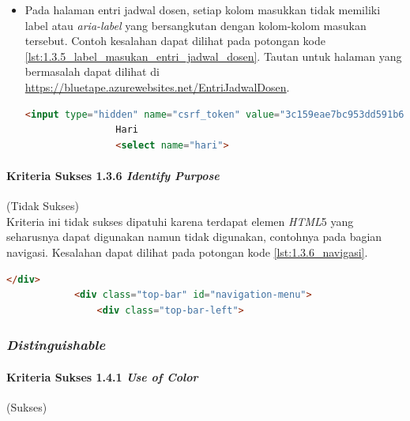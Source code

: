 \documentclass[a4paper,twoside]{article}
\begin{document}
\begin{enumerate}
\begin{itemize}
			\item Pada halaman entri jadwal dosen, setiap kolom masukkan tidak memiliki label atau \textit{aria-label} yang bersangkutan dengan kolom-kolom masukan tersebut. Contoh kesalahan dapat dilihat pada potongan kode \ref{lst:1.3.5_label_masukan_entri_jadwal_dosen}. Tautan untuk halaman yang bermasalah dapat dilihat di \url{https://bluetape.azurewebsites.net/EntriJadwalDosen}.
			\begin{lstlisting}[frame=single, label={lst:1.3.5_label_masukan_entri_jadwal_dosen}, language=HTML, caption=Kriteria Sukses 1.3.5 - Tidak Terdapat Label pada Kolom Masukan di Halaman Entri Jadwal Dosen]
				<input type="hidden" name="csrf_token" value="3c159eae7bc953dd591b679c080ed066" />
				Hari
				<select name="hari">
			\end{lstlisting}
		\end{itemize}

		\paragraph{Kriteria Sukses 1.3.6 \textit{Identify Purpose}}
		\label{par:kepatuhan_bluetape_kriteria_sukses_1.3.6}
		(Tidak Sukses)\\

		Kriteria ini tidak sukses dipatuhi karena terdapat elemen \textit{HTML}5 yang seharusnya dapat digunakan namun tidak digunakan, contohnya pada bagian navigasi. Kesalahan dapat dilihat pada potongan kode \ref{lst:1.3.6_navigasi}.

		\begin{lstlisting}[frame=single, label={lst:1.3.6_navigasi}, language=HTML, caption=Kriteria Sukses 1.3.6 - Navigasi]
			</div>
			<div class="top-bar" id="navigation-menu">
				<div class="top-bar-left">
		\end{lstlisting}

		\subsubsection*{\textit{Distinguishable}}
		\label{subsubsec:kepatuhan_bluetape_distinguishable}

		\paragraph{Kriteria Sukses 1.4.1 \textit{Use of Color}}
		\label{par:kepatuhan_bluetape_kriteria_sukses_1.4.1}
		(Sukses)\\


\end{enumerate}
\end{document}
